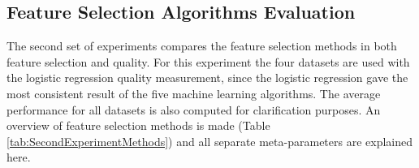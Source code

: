 \documentclass[10pt,a4paper]{article}
\begin{document}
	\subsection{Feature Selection Algorithms Evaluation}
	\label{subsec:FeatureSelectionAlgorithmsEvaluation}

	The second set of experiments compares the feature selection methods in both feature selection and quality. For this experiment the four datasets are used with the logistic regression quality measurement, since the logistic regression gave the most consistent result of the five machine learning algorithms. The average performance for all datasets is also computed for clarification purposes. An overview of feature selection methods is made (Table \ref{tab:SecondExperimentMethods}) and all separate meta-parameters are explained here.
	
\end{document}
